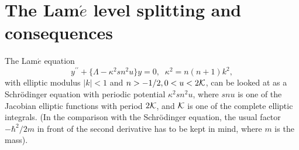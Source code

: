 \documentclass[a4paper,12pt,a4]{article}
\begin{document}
\section{The Lam${\acute e}$ level splitting and consequences}
The Lam${\acute e}$ equation \cite{8}
\begin{equation}
y^{\prime\prime}+\bigg\{\Lambda -\kappa^2 sn^2u\bigg\}y=0, \;\; \kappa^2
=n(n+1)k^2,
\label{1}
\end{equation}
with elliptic modulus $|k|<1$ and $n>-1/2, 0<u<2{\cal K}$, can be
looked at as a Schr\"odinger equation with periodic potential
$\kappa^2sn^2u$, where $sn u$ is one of the Jacobian elliptic functions
with period $2{\cal K}$, and ${\cal K}$ is one of the complete
elliptic integrals. (In the comparison with the Schr\"odinger
equation, the usual factor $-\hbar^2/2m$ in front of the second
derivative has to be kept in mind, where $m$ is the mass).
\end{document}
